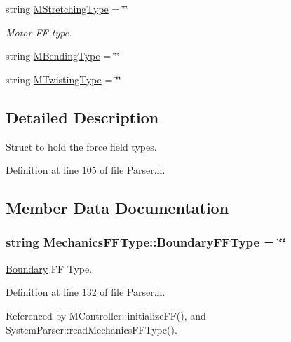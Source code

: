 {\bf }\par
\begin{DoxyCompactItemize}
\item 
string \hyperlink{structMechanicsFFType_a30fba4413229de2a9ab88af789e47292}{M\+Stretching\+Type} = \char`\"{}\char`\"{}
\begin{DoxyCompactList}\small\item\em Motor F\+F type. \end{DoxyCompactList}\item 
string \hyperlink{structMechanicsFFType_a0bed42c13d0c33d3b37738b44494d8bf}{M\+Bending\+Type} = \char`\"{}\char`\"{}
\item 
string \hyperlink{structMechanicsFFType_a76f25f6b34dc38d73dfecb236500c53b}{M\+Twisting\+Type} = \char`\"{}\char`\"{}
\end{DoxyCompactItemize}



\subsection{Detailed Description}
Struct to hold the force field types. 

Definition at line 105 of file Parser.\+h.



\subsection{Member Data Documentation}
\hypertarget{structMechanicsFFType_ad83b593a03dacd9224f526da4714aa25}{
\subsubsection[{Boundary\+F\+F\+Type}]{\setlength{\rightskip}{0pt plus 5cm}string Mechanics\+F\+F\+Type\+::\+Boundary\+F\+F\+Type = \char`\"{}\char`\"{}}}\label{structMechanicsFFType_ad83b593a03dacd9224f526da4714aa25}


\hyperlink{classBoundary}{Boundary} F\+F Type. 



Definition at line 132 of file Parser.\+h.



Referenced by M\+Controller\+::initialize\+F\+F(), and System\+Parser\+::read\+Mechanics\+F\+F\+Type().

